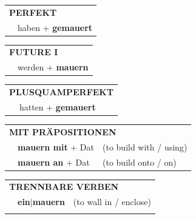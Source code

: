 \documentclass[10pt,a4paper]{revtex4-2}
\begin{document}
\begin{verbbox}
 \begin{tabular}{rl}
     \multicolumn{2}{l}{\textbf{PERFEKT}}\\
   & haben + \textbf{gemauert}\\
  \end{tabular}
\hfill
\begin{tabular}{rl}
    \multicolumn{2}{l}{\textbf{FUTURE I}}\\
   & werden + \textbf{mauern}\\
  \end{tabular}
\hfill
\begin{tabular}{rl}
    \multicolumn{2}{l}{\textbf{PLUSQUAMPERFEKT}}\\
   & hatten + \textbf{gemauert}\\
  \end{tabular}

 \vspace{10pt}

\begin{tabular}{lll}
      \multicolumn{3}{l}{\textbf{MIT PRÄPOSITIONEN}}\\
& \textbf{mauern mit} + Dat & (to build with / using)\\
& \textbf{mauern an} + Dat & (to build onto / on)\\
\end{tabular}
  \hfill
\begin{tabular}{lll}
      \multicolumn{3}{l}{\textbf{TRENNBARE VERBEN}}\\
 & \textbf{ein$|$mauern} & (to wall in / enclose)\\
\vspace{10pt}
  \end{tabular}

  \vspace{-5pt}

\end{verbbox}
\end{document}
